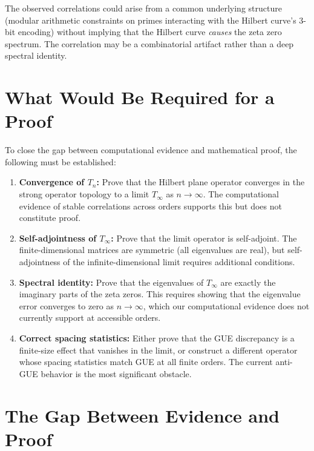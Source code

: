 \documentclass[11pt,a4paper]{article}
\begin{document}
The observed correlations could arise from a common underlying
structure (modular arithmetic constraints on primes interacting with
the Hilbert curve's 3-bit encoding) without implying that the Hilbert
curve \emph{causes} the zeta zero spectrum.  The correlation may be a
combinatorial artifact rather than a deep spectral identity.

\section{What Would Be Required for a Proof}

To close the gap between computational evidence and mathematical proof,
the following must be established:

\begin{enumerate}
\item \textbf{Convergence of $T_n$:} Prove that the Hilbert plane
   operator converges in the strong operator topology to a limit
   $T_\infty$ as $n \to \infty$.  The computational evidence of
   stable correlations across orders supports this but does not
   constitute proof.

\item \textbf{Self-adjointness of $T_\infty$:} Prove that the limit
   operator is self-adjoint.  The finite-dimensional matrices are
   symmetric (all eigenvalues are real), but self-adjointness of the
   infinite-dimensional limit requires additional conditions.

\item \textbf{Spectral identity:} Prove that the eigenvalues of
   $T_\infty$ are exactly the imaginary parts of the zeta zeros.
   This requires showing that the eigenvalue error converges to zero
   as $n \to \infty$, which our computational evidence does not
   currently support at accessible orders.

\item \textbf{Correct spacing statistics:} Either prove that the
   GUE discrepancy is a finite-size effect that vanishes in the
   limit, or construct a different operator whose spacing statistics
   match GUE at all finite orders.  The current anti-GUE behavior
   is the most significant obstacle.

\end{enumerate}

\section{The Gap Between Evidence and Proof}
\end{document}
